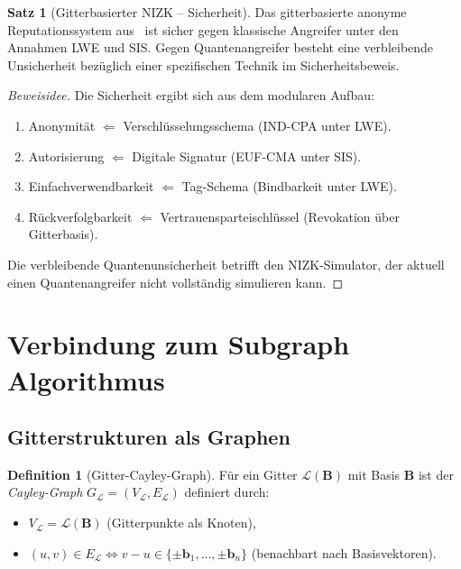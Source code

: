﻿\documentclass[a4paper,12pt]{article}
\theoremstyle{definition}
\newtheorem{definition}{Definition}
\newtheorem{satz}{Satz}
\newcommand{\Lat}{\mathcal{L}}
\newcommand{\B}{\mathbf{B}}
\begin{document}
\begin{satz}[Gitterbasierter NIZK -- Sicherheit]
\label{satz:nizk}
Das gitterbasierte anonyme Reputationssystem aus~\cite{BBP23} ist sicher gegen
klassische Angreifer unter den Annahmen LWE und SIS.
Gegen Quantenangreifer besteht eine verbleibende Unsicherheit bezüglich einer
spezifischen Technik im Sicherheitsbeweis.
\end{satz}

\begin{proof}[Beweisidee]
Die Sicherheit ergibt sich aus dem modularen Aufbau:
\begin{enumerate}
    \item Anonymität $\Leftarrow$ Verschlüsselungsschema (IND-CPA unter LWE).
    \item Autorisierung $\Leftarrow$ Digitale Signatur (EUF-CMA unter SIS).
    \item Einfachverwendbarkeit $\Leftarrow$ Tag-Schema (Bindbarkeit unter LWE).
    \item Rückverfolgbarkeit $\Leftarrow$ Vertrauensparteischlüssel (Revokation über Gitterbasis).
\end{enumerate}
Die verbleibende Quantenunsicherheit betrifft den NIZK-Simulator,
der aktuell einen Quantenangreifer nicht vollständig simulieren kann.
\end{proof}

\section{Verbindung zum Subgraph Algorithmus}

\subsection{Gitterstrukturen als Graphen}

\begin{definition}[Gitter-Cayley-Graph]
Für ein Gitter $\Lat(\B)$ mit Basis $\B$ ist der \emph{Cayley-Graph}
$G_\Lat = (V_\Lat, E_\Lat)$ definiert durch:
\begin{itemize}
    \item $V_\Lat = \Lat(\B)$ (Gitterpunkte als Knoten),
    \item $(u, v) \in E_\Lat \iff v - u \in \{\pm \mathbf{b}_1, \ldots, \pm \mathbf{b}_n\}$ (benachbart nach Basisvektoren).
\end{itemize}
\end{definition}
\end{document}
